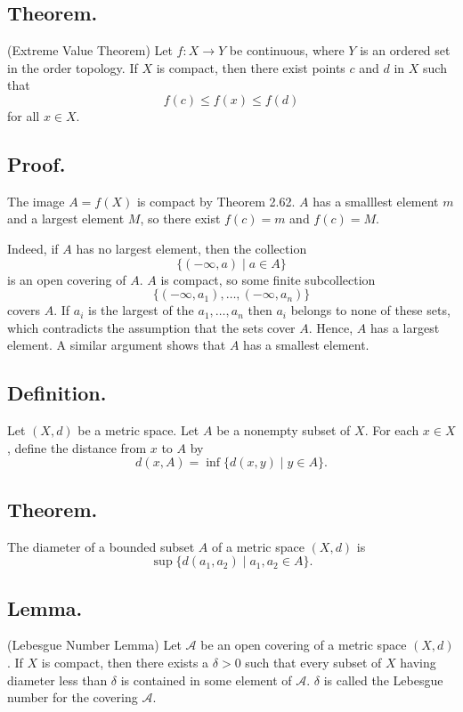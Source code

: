 \documentclass[titlepage]{article}
\begin{document}
\subsection{Theorem.} (Extreme Value Theorem) Let $f: X \to Y$ be continuous, where $Y$ is an ordered set in the order topology. If $X$ is compact, then there exist points $c$ and $d$ in $X$ such that $$f(c) \leq f(x) \leq f(d)$$ for all $x \in X$.

\subsection{Proof.} The image $A = f(X)$ is compact by Theorem 2.62. $A$ has a smalllest element $m$ and a largest element $M$, so there exist $f(c) = m$ and $f(c) = M$.

Indeed, if $A$ has no largest element, then the collection 
$$\{(-\infty, a) \mid a \in A \}$$
is an open covering of $A$. $A$ is compact, so some finite subcollection 
$$\{(-\infty, a_{1}), \ldots, (-\infty, a_{n})\}$$
covers $A$. If $a_{i}$ is the largest of the $a_{1}, \ldots, a_{n}$ then $a_{i}$ belongs to none of these sets, which contradicts the assumption that the sets cover $A$. Hence, $A$ has a largest element. A similar argument shows that $A$ has a smallest element.

\subsection{Definition.} Let $(X, d)$ be a metric space. Let $A$ be a nonempty subset of $X$. For each $x \in X$, define the distance from $x$ to $A$ by 
$$d(x, A) = \inf \{d(x, y) \mid y \in A\}.$$

\subsection{Theorem.} The diameter of a bounded subset $A$ of a metric space $(X, d)$ is 
$$\sup \{d(a_{1}, a_{2}) \mid a_{1}, a_{2} \in A\}.$$

\subsection{Lemma.} (Lebesgue Number Lemma) Let $\mathcal{A}$ be an open covering of a metric space $(X, d)$. If $X$ is compact, then there exists a $\delta > 0$ such that every subset of $X$ having diameter less than $\delta$ is contained in some element of $\mathcal{A}$. $\delta$ is called the Lebesgue number for the covering $\mathcal{A}$.
\end{document}
